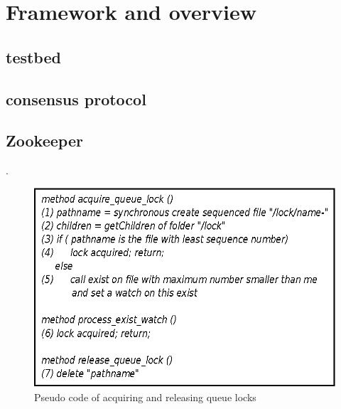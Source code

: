 \section{Framework and overview}\label{sec:framework}

\subsection{testbed}

\subsection{consensus protocol}

\subsection{Zookeeper}
.

\begin{figure}[h]
\centering
\includegraphics[scale=0.85]{img/queue_lock_pseudo.eps}
\caption{Pseudo code of acquiring and releasing queue locks}
\label{fig:queue_lock_pseudo}
\end{figure}

